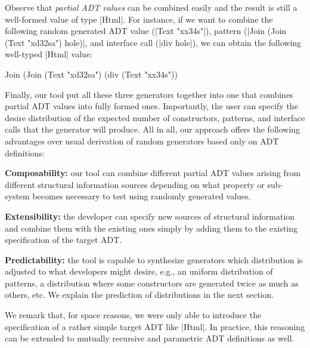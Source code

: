 Observe that \emph{partial ADT values} can be combined easily and the result is
still a well-formed value of type |Html|.
%
For instance, if we want to combine the following random generated ADT value
(|Text "xx34s"|), pattern (|Join (Join (Text "xd32sa") hole)|, and interface
call (|div hole|), we can obtain the following well-typed |Html| value:
%
\begin{code}
 Join (Join (Text "xd32sa") (div (Text "xx34s"))
\end{code}


Finally, our tool put all these three generators together into one that combines
partial ADT values into fully formed ones.
%
Importantly, the user can specify the desire distribution of the expected number
of constructors, patterns, and interface calls that the generator will produce.
%
All in all, our approach offers the following advantages over usual derivation
of random generators based only on ADT definitions:
%
\begin{CompactItemize}
\item \textbf{Composability:} our tool can combine different partial ADT values
  arising from different structural information sources depending on what
  property or sub-system becomes necessary to test using randomly generated
  values.
\item \textbf{Extensibility:} the developer can specify new sources of
  structural information and combine them with the existing ones simply by
  adding them to the existing specification of the target ADT.
\item \textbf{Predictability:} the tool is capable to synthesize generators
  which distribution is adjusted to what developers might desire, e.g., an
  uniform distribution of patterns, a distribution where some constructors are
  generated twice as much as others, etc. We explain the prediction of
  distributions in the next section.
\end{CompactItemize}


We remark that, for space reasons, we were only able to introduce the
specification of a rather simple target ADT like |Html|.
%
In practice, this reasoning can be extended to mutually recursive and parametric
ADT definitions as well.

